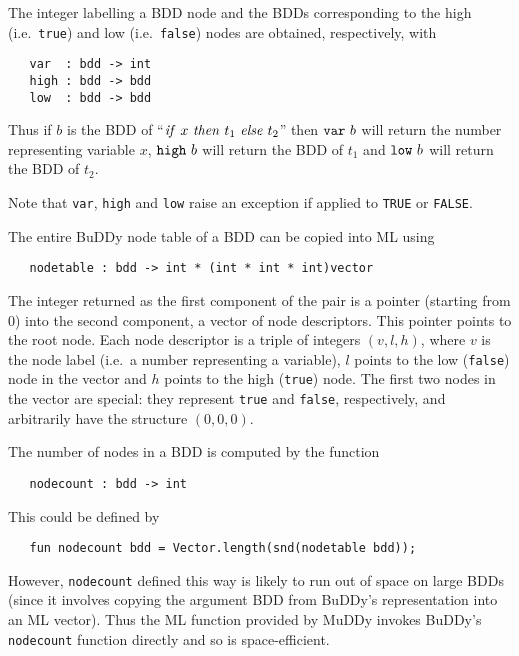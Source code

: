 \documentclass[12pt]{article}
\newcommand{\bnind}[1]{\index[MLbn]{#1}}
\renewcommand{\t}[1]{\mbox{\tt #1}}
\newcommand{\ml}[1]{{\tt #1}}
\newcommand{\Buddy}{BuDDy\xspace}
\newcommand{\Muddy}{MuDDy\xspace}
\begin{document}
The integer labelling a BDD node and the BDDs corresponding to the high
(i.e.~{\t{true}}) and low (i.e.~{\t{false}}) nodes are obtained,
respectively, with

\begin{verbatim}
   var  : bdd -> int
   high : bdd -> bdd
   low  : bdd -> bdd
\end{verbatim}\bnind{\ml{var}}\bnind{\ml{high}}\bnind{\ml{low}}

Thus if $b$ is the BDD of ``${\it{if}}~x~{\it{then}}~t_1~{\it{else}}~t_2$''
then $\t{var}~b$ will return the number representing variable $x$,
$\t{high}~b$ will return the BDD of $t_1$ and $\t{low}~b$ will return
the BDD of $t_2$.

Note that \t{var}, \t{high} and \t{low} raise an exception if applied
to \t{TRUE} or \t{FALSE}.

The entire \Buddy{} node table of a BDD can be copied into ML using

\begin{verbatim}
   nodetable : bdd -> int * (int * int * int)vector
\end{verbatim}\bnind{\ml{nodetable}}

The integer returned as the first component of the pair is a pointer
(starting from 0) into the second component, a vector of node
descriptors. This pointer points to the root node. Each node
descriptor is a triple of integers $(v,l,h)$, where $v$ is the node
label (i.e.~a number representing a variable), $l$ points to the low
({\t{false}}) node in the vector and $h$ points to the high
({\t{true}}) node. The first two nodes in the vector are special:
they represent {\t{true}} and {\t{false}}, respectively, and arbitrarily have
the structure $(0,0,0)$.

The number of nodes in a BDD is computed by the function

\begin{verbatim}
   nodecount : bdd -> int
\end{verbatim}\bnind{\ml{nodecount}}

This could be defined by

\begin{verbatim}
   fun nodecount bdd = Vector.length(snd(nodetable bdd));
\end{verbatim}

However, \t{nodecount} defined this way is likely to run out of space
on large BDDs (since it involves copying the argument BDD from
\Buddy's representation into an ML vector).  Thus the ML function
provided by \Muddy{} invokes \Buddy's \t{nodecount} function directly
and so is space-efficient.
\end{document}
